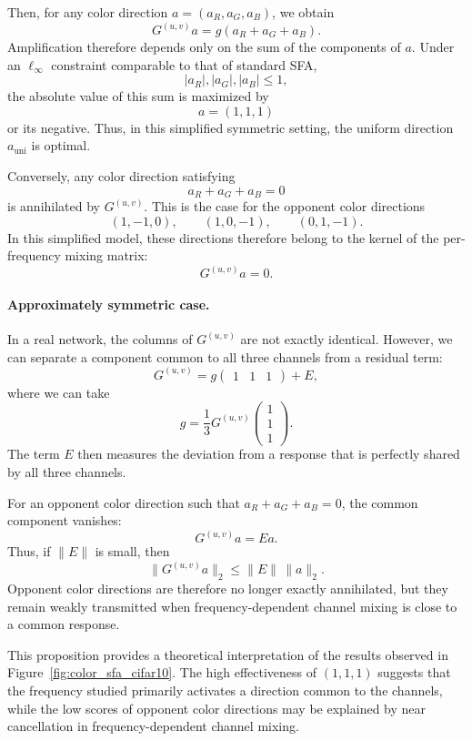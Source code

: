 Then, for any color direction $a=(a_R,a_G,a_B)$, we obtain
\[
    G^{(u,v)}a
    =
    g(a_R+a_G+a_B).
\]
Amplification therefore depends only on the sum of the components of $a$. Under an
$\ell_\infty$ constraint comparable to that of standard SFA,
\[
    |a_R|, |a_G|, |a_B| \leq 1,
\]
the absolute value of this sum is maximized by
\[
    a=(1,1,1)
\]
or its negative. Thus, in this simplified symmetric setting, the uniform direction
$a_{\mathrm{uni}}$ is optimal.

Conversely, any color direction satisfying
\[
    a_R+a_G+a_B=0
\]
is annihilated by $G^{(u,v)}$. This is the case for the opponent color directions
\[
    (1,-1,0), \qquad (1,0,-1), \qquad (0,1,-1).
\]
In this simplified model, these directions therefore belong to the kernel of the per-frequency
mixing matrix:
\[
    G^{(u,v)}a = 0.
\]

\paragraph{Approximately symmetric case.}
In a real network, the columns of $G^{(u,v)}$ are not exactly identical. However, we can
separate a component common to all three channels from a residual term:
\[
    G^{(u,v)}
    =
    g
    \begin{pmatrix}
    1 & 1 & 1
    \end{pmatrix}
    + E,
\]
where we can take
\[
    g
    =
    \frac{1}{3}G^{(u,v)}
    \begin{pmatrix}
    1 \\ 1 \\ 1
    \end{pmatrix}.
\]
The term $E$ then measures the deviation from a response that is perfectly shared by all three channels.

For an opponent color direction such that $a_R+a_G+a_B=0$, the common component
vanishes:
\[
    G^{(u,v)}a = Ea.
\]
Thus, if $\|E\|$ is small, then
\[
    \|G^{(u,v)}a\|_2
    \leq
    \|E\|\,\|a\|_2.
\]
Opponent color directions are therefore no longer exactly annihilated, but they remain
weakly transmitted when frequency-dependent channel mixing is close to a common
response.

This proposition provides a theoretical interpretation of the results observed in
Figure~\ref{fig:color_sfa_cifar10}. The high effectiveness of $(1,1,1)$ suggests that the frequency
studied primarily activates a direction common to the channels, while the low scores
of opponent color directions may be explained by near cancellation in
frequency-dependent channel mixing.

